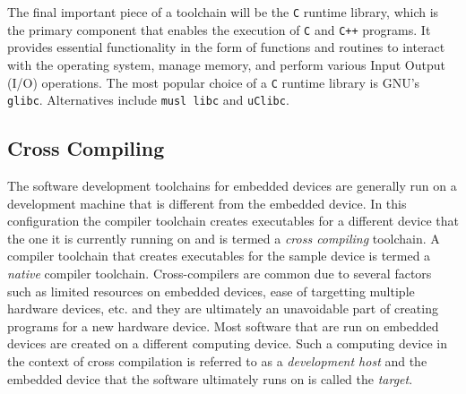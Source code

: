 The final important piece of a toolchain will be the \texttt{C} runtime library, which is the primary component that enables the execution of \texttt{C} and \texttt{C++} programs. It provides essential functionality in the form of functions and routines to interact with the operating system, manage memory, and perform various Input Output (I/O) operations. The most popular choice of a \texttt{C} runtime library is GNU's \texttt{glibc}. Alternatives include \texttt{musl libc} and \texttt{uClibc}.

\subsection{Cross Compiling}

The software development toolchains for embedded devices are generally run on a development machine that is different from the embedded device. In this configuration the compiler toolchain creates executables for a different device that the one it is currently running on and is termed a \textit{cross compiling} toolchain. A compiler toolchain that creates executables for the sample device is termed a \textit{native} compiler toolchain. Cross-compilers are common due to several factors such as limited resources on embedded devices, ease of targetting multiple hardware devices, etc. and they are ultimately an unavoidable part of creating programs for a new hardware device. Most software that are run on embedded devices are created on a different computing device. Such a computing device in the context of cross compilation is referred to as a \textit{development host} and the embedded device that the software ultimately runs on is called the \textit{target}.

\begin{figure}[H]
	\centering
\end{figure}

